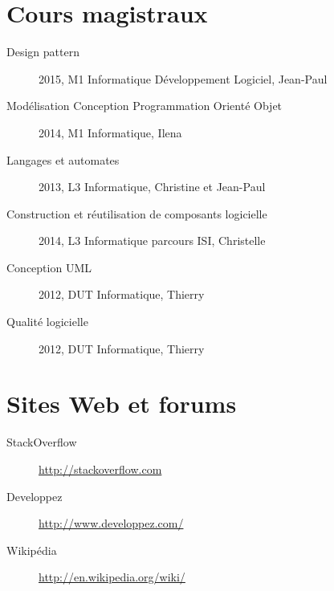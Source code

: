 \section{Cours magistraux}
\begin{description}
	\item[Design pattern] 2015, M1 Informatique Développement Logiciel, Jean-Paul 
	\item[Modélisation Conception Programmation Orienté Objet] 2014, M1 Informatique, Ilena 
	\item[Langages et automates] 2013, L3 Informatique, Christine  et Jean-Paul 
	\item[Construction et réutilisation de composants logicielle] 2014, L3 Informatique parcours ISI, Christelle 
	\item[Conception UML] 2012, DUT Informatique, Thierry 
	\item[Qualité logicielle] 2012, DUT Informatique, Thierry 
\end{description}
\newpage
\section{Sites Web et forums}
	\begin{description}
		\item[StackOverflow] \url{http://stackoverflow.com}
		\item[Developpez] \url{http://www.developpez.com/}
		\item[Wikipédia] \url{http://en.wikipedia.org/wiki/}
	\end{description}

